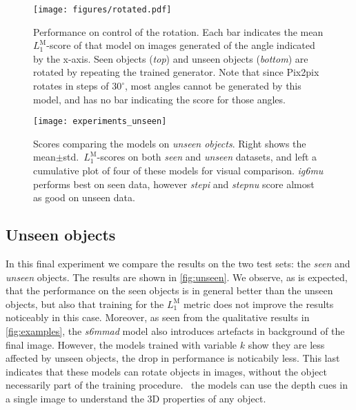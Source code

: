 \documentclass[runningheads]{llncs}
\let\wip\emph
\def\wmad{$L_1^{\textrm{M}}$\xspace}
\begin{document}
\begin{figure}[t]
    \centering
    \texttt{[image: figures/rotated.pdf]}
    \caption{
        Performance on control of the rotation. Each bar indicates the mean \wmad-score of that model on images generated of the angle indicated by the x-axis.
        Seen objects (\emph{top}) and unseen objects (\emph{bottom}) are rotated by repeating the trained generator.
        Note that since Pix2pix rotates in steps of $30^\circ$, most angles cannot be generated by this model, and has no bar indicating the score for those angles.
    }
    \label{fig:rot}
    \vspace{-5mm}
\end{figure}\begin{figure}
    \centering
    \raisebox{16mm}{\resizebox*{!}{32.5mm}{}}
    \texttt{[image: experiments\_unseen]}
    \vspace{-3mm}    
    \caption{
        Scores comparing the models on {\em unseen objects}. Right shows the mean$\pm$std.\ \wmad-scores on both \emph{seen} and \emph{unseen} datasets, and left a cumulative plot of four of these models for visual comparison. \wip{ig6mu} performs best on seen data, however \wip{stepi} and \wip{stepnu} score almost as good on unseen data.
    }
    \label{fig:unseen}
\end{figure}\vspace{-5pt}\subsection{Unseen objects}
In this final experiment we compare the results on the two test sets: the \emph{seen} and \emph{unseen} objects.
The results are shown in \autoref{fig:unseen}.
We observe, as is expected, that the performance on the seen objects is in general better than the unseen objects, but also that training for the \wmad metric does not improve the results noticeably in this case.
Moreover, as seen from the qualitative results in \autoref{fig:examples}, the \wip{s6mmad} model also introduces artefacts in background of the final image.
However, the models trained with variable $k$ show they are less affected by unseen objects, the drop in performance is noticabily less.
This last indicates that these models can rotate objects in images, without the object necessarily part of the training procedure.
\Ie~the models can use the depth cues in a single image to understand the 3D properties of any object.
\end{document}
